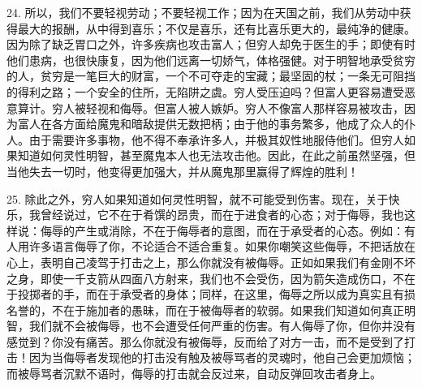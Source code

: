 24. 所以，我们不要轻视劳动；不要轻视工作；因为在天国之前，我们从劳动中获得最大的报酬，从中得到喜乐；不仅是喜乐，还有比喜乐更大的，最纯净的健康。因为除了缺乏胃口之外，许多疾病也攻击富人；但穷人却免于医生的手；即使有时他们患病，也很快康复，因为他们远离一切娇气，体格强健。对于明智地承受贫穷的人，贫穷是一笔巨大的财富，一个不可夺走的宝藏；最坚固的杖；一条无可阻挡的得利之路；一个安全的住所，无陷阱之虞。穷人受压迫吗？但富人更容易遭受恶意算计。穷人被轻视和侮辱。但富人被人嫉妒。穷人不像富人那样容易被攻击，因为富人在各方面给魔鬼和暗敌提供无数把柄；由于他的事务繁多，他成了众人的仆人。由于需要许多事物，他不得不奉承许多人，并极其奴性地服侍他们。但穷人如果知道如何灵性明智，甚至魔鬼本人也无法攻击他。因此，在此之前虽然坚强，但当他失去一切时，他变得更加强大，并从魔鬼那里赢得了辉煌的胜利！\par

25. 除此之外，穷人如果知道如何灵性明智，就不可能受到伤害。现在，关于快乐，我曾经说过，它不在于肴馔的昂贵，而在于进食者的心态；对于侮辱，我也这样说：侮辱的产生或消除，不在于侮辱者的意图，而在于承受者的心态。例如：有人用许多语言侮辱了你，不论适合不适合重复。如果你嘲笑这些侮辱，不把话放在心上，表明自己凌驾于打击之上，那么你就没有被侮辱。正如如果我们有金刚不坏之身，即使一千支箭从四面八方射来，我们也不会受伤，因为箭矢造成伤口，不在于投掷者的手，而在于承受者的身体；同样，在这里，侮辱之所以成为真实且有损名誉的，不在于施加者的愚昧，而在于被侮辱者的软弱。如果我们知道如何真正明智，我们就不会被侮辱，也不会遭受任何严重的伤害。有人侮辱了你，但你并没有感觉到？你没有痛苦。那么你就没有被侮辱，反而给了对方一击，而不是受到了打击！因为当侮辱者发现他的打击没有触及被辱骂者的灵魂时，他自己会更加烦恼；而被辱骂者沉默不语时，侮辱的打击就会反过来，自动反弹回攻击者身上。\par

